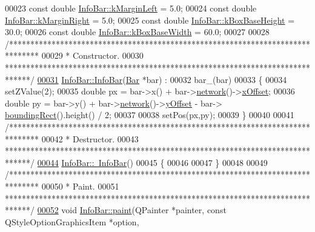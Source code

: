 \begin{DoxyCode}
00023 \textcolor{keyword}{const} \textcolor{keywordtype}{double} \hyperlink{class_info_bar_a2ed246fc7b7917ba8141b55cbd023d5c}{InfoBar::kMarginLeft} = 5.0;
00024 \textcolor{keyword}{const} \textcolor{keywordtype}{double} \hyperlink{class_info_bar_aa16c67708cd2ab938e1dc8be5f168614}{InfoBar::kMarginRight} = 5.0;
00025 \textcolor{keyword}{const} \textcolor{keywordtype}{double} \hyperlink{class_info_bar_a0f2f7b614000ae1d317ec3819acabbf2}{InfoBar::kBoxBaseHeight} = 30.0;
00026 \textcolor{keyword}{const} \textcolor{keywordtype}{double} \hyperlink{class_info_bar_a3eb5cc879199e1a927ed76eb989c4c0e}{InfoBar::kBoxBaseWidth} = 60.0;
00027 
00028 \textcolor{comment}{/*******************************************************************************}
00029 \textcolor{comment}{ * Constructor.}
00030 \textcolor{comment}{ ******************************************************************************/}
\hypertarget{infobar_8cpp_source_l00031}{}\hyperlink{class_info_bar_aab5c08f226901c8827a97efbdfb5122a}{00031} \hyperlink{class_info_bar_aab5c08f226901c8827a97efbdfb5122a}{InfoBar::InfoBar}(\hyperlink{class_bar}{Bar} *bar) :
00032   bar\_(bar)
00033 \{
00034   setZValue(2);
00035   \textcolor{keywordtype}{double} px = bar->x() + bar->\hyperlink{group___models_gab0594d5d7313e8749bb85434b255db9a}{network}()->\hyperlink{class_network_a9f5c70be28a45320802bd0ac3947d114}{xOffset};
00036   \textcolor{keywordtype}{double} py = bar->y() + bar->\hyperlink{group___models_gab0594d5d7313e8749bb85434b255db9a}{network}()->\hyperlink{class_network_a771b16f7eb4459d0ca7141c048b1ab59}{yOffset} - bar->
      \hyperlink{group___models_ga8279d8109019cc7e139e2023690496be}{boundingRect}().height() / 2;
00037 
00038   setPos(px,py);
00039 \}
00040 
00041 \textcolor{comment}{/*******************************************************************************}
00042 \textcolor{comment}{ * Destructor.}
00043 \textcolor{comment}{ ******************************************************************************/}
\hypertarget{infobar_8cpp_source_l00044}{}\hyperlink{class_info_bar_a954baa28d750739c80c029818d267d8e}{00044} \hyperlink{class_info_bar_a954baa28d750739c80c029818d267d8e}{InfoBar::~InfoBar}()
00045 \{
00046 
00047 \}
00048 
00049 \textcolor{comment}{/*******************************************************************************}
00050 \textcolor{comment}{ * Paint.}
00051 \textcolor{comment}{ ******************************************************************************/}
\hypertarget{infobar_8cpp_source_l00052}{}\hyperlink{class_info_bar_afa011ce96bb99021d2cbf5b24c7276bb}{00052} \textcolor{keywordtype}{void} \hyperlink{class_info_bar_afa011ce96bb99021d2cbf5b24c7276bb}{InfoBar::paint}(QPainter *painter, \textcolor{keyword}{const} QStyleOptionGraphicsItem *option,

\end{DoxyCode}
